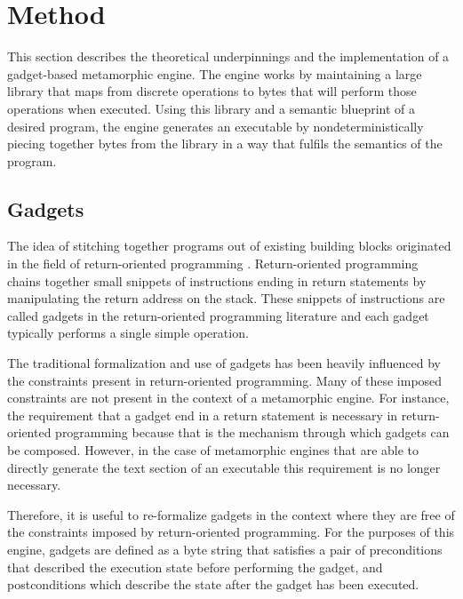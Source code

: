 \chapter{Method}

    This section describes the theoretical underpinnings and the implementation
    of a gadget-based metamorphic engine. The engine works by maintaining a
    large library that maps from discrete operations to bytes that will perform
    those operations when executed. Using this library and a semantic blueprint
    of a desired program, the engine generates an executable by
    nondeterministically piecing together bytes from the library in a way that
    fulfils the semantics of the program.

    \section{Gadgets}
    
    The idea of stitching together programs out of existing building blocks
    originated in the field of return-oriented programming \cite{rop_geo}.
    Return-oriented programming chains together small snippets of instructions
    ending in return statements by manipulating the return address on the stack.
    These snippets of instructions are called gadgets in the return-oriented
    programming literature and each gadget typically performs a single simple
    operation.

    The traditional formalization and use of gadgets has been heavily influenced
    by the constraints present in return-oriented programming. Many of these
    imposed constraints are not present in the context of a metamorphic engine.
    For instance, the requirement that a gadget end in a return statement is
    necessary in return-oriented programming because that is the mechanism
    through which gadgets can be composed. However, in the case of metamorphic
    engines that are able to directly generate the text section of an executable
    this requirement is no longer necessary.

    Therefore, it is useful to re-formalize gadgets in the context where they
    are free of the constraints imposed by return-oriented programming. For the
    purposes of this engine, gadgets are defined as a byte string that satisfies
    a pair of preconditions that described the execution state before performing
    the gadget, and postconditions which describe the state after the gadget has
    been executed.

